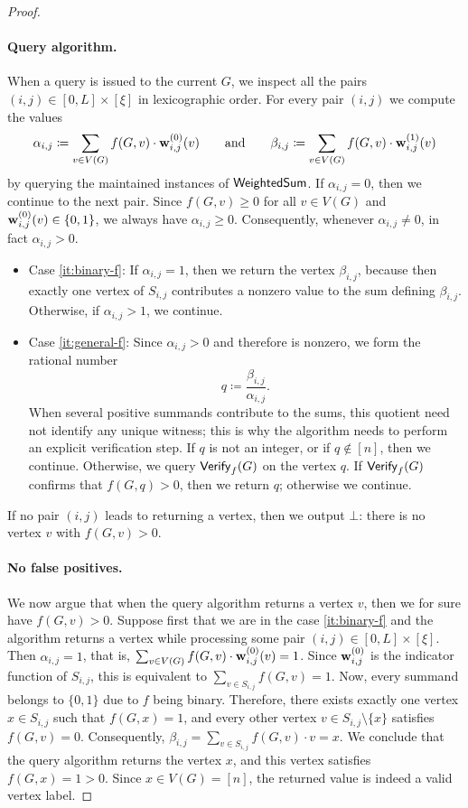 \begin{proof}
\paragraph*{Query algorithm.}
When a query is issued to the current $G$, we inspect all the pairs $(i,j)\in [0,L]\times [\xi]$ in lexicographic order.
For every pair $(i,j)$ we compute the values 
\[\alpha_{i,j}\coloneqq \sum_{v\in V(G)} f(G,v)\cdot \mathbf{w}^{(0)}_{i,j}(v)\qquad\textrm{and}\qquad \beta_{i,j}\coloneqq \sum_{v\in V(G)} f(G,v)\cdot \mathbf{w}^{(1)}_{i,j}(v)\] by querying the maintained instances of $\mathsf{WeightedSum}$.
If $\alpha_{i,j}=0$, then we continue to the next pair.
Since $f(G,v)\ge 0$ for all $v\in V(G)$ and $\mathbf{w}^{(0)}_{i,j}(v)\in\{0,1\}$, we always have $\alpha_{i,j}\ge 0$.
Consequently, whenever $\alpha_{i,j}\neq 0$, in fact $\alpha_{i,j}>0$.
\begin{itemize}
\item Case \ref{it:binary-f}: If $\alpha_{i,j}=1$, then we return the vertex $\beta_{i,j}$, because then exactly one vertex of $S_{i,j}$ contributes a nonzero value to the sum defining $\beta_{i,j}$. Otherwise, if $\alpha_{i,j}>1$, we continue.
\item Case \ref{it:general-f}: Since $\alpha_{i,j}>0$ and therefore is nonzero, we form the rational number \[q\coloneqq \frac{\beta_{i,j}}{\alpha_{i,j}}.\]
When several positive summands contribute to the sums, this quotient need not identify any unique witness; this is why the algorithm needs to perform an explicit verification step.
If $q$ is not an integer, or if $q\notin[n]$, then we continue.
Otherwise, we query $\mathsf{Verify}_f(G)$ on the vertex $q$.
If $\mathsf{Verify}_f(G)$ confirms that $f(G,q)>0$, then we return $q$; otherwise we continue.
\end{itemize}
If no pair $(i,j)$ leads to returning a vertex, then we output $\bot$:  there is no vertex $v$ with $f(G,v)>0$.

\paragraph*{No false positives.} We now argue that when the query algorithm returns a vertex $v$, then we for sure have $f(G,v)>0$.
Suppose first that we are in the case \ref{it:binary-f} and the algorithm returns a vertex while processing some pair $(i,j)\in [0,L]\times [\xi]$.
Then $\alpha_{i,j}=1$, that is, $\sum_{v\in V(G)} f(G,v)\cdot \mathbf{w}^{(0)}_{i,j}(v)=1$.
Since $\mathbf{w}^{(0)}_{i,j}$ is the indicator function of $S_{i,j}$, this is equivalent to $\sum_{v\in S_{i,j}} f(G,v)=1$.
Now, every summand belongs to $\{0,1\}$ due to $f$ being binary.
Therefore, there exists exactly one vertex $x\in S_{i,j}$ such that $f(G,x)=1$, and every other vertex $v\in S_{i,j}\setminus\{x\}$ satisfies $f(G,v)=0$.
Consequently, $\beta_{i,j}=\sum_{v\in S_{i,j}} f(G,v)\cdot v=x$.
We conclude that the query algorithm returns the vertex $x$, and this vertex satisfies $f(G,x)=1>0$.
Since $x\in V(G)=[n]$, the returned value is indeed a valid vertex label.


\end{proof}
